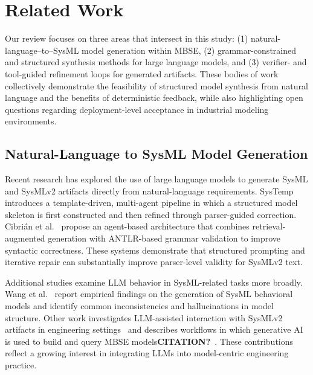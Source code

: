 \documentclass[colorlinks,upint,subscriptcorrection,varvw,hyphenate,balance]{asmeconf} %
\begin{document}

\section{Related Work}

Our review focuses on three areas that intersect in this study: (1) natural-language--to--SysML model generation within MBSE, (2) grammar-constrained and structured synthesis methods for large language models, and (3) verifier- and tool-guided refinement loops for generated artifacts. These bodies of work collectively demonstrate the feasibility of structured model synthesis from natural language and the benefits of deterministic feedback, while also highlighting open questions regarding deployment-level acceptance in industrial modeling environments.

\subsection{Natural-Language to SysML Model Generation}

Recent research has explored the use of large language models to generate SysML and SysMLv2 artifacts directly from natural-language requirements. SysTemp~\cite{bouamra2025systemp} introduces a template-driven, multi-agent pipeline in which a structured model skeleton is first constructed and then refined through parser-guided correction. Cibri{\'a}n et al.~\cite{cibrian2025sysmlagent} propose an agent-based architecture that combines retrieval-augmented generation with ANTLR-based grammar validation to improve syntactic correctness. These systems demonstrate that structured prompting and iterative repair can substantially improve parser-level validity for SysMLv2 text.

Additional studies examine LLM behavior in SysML-related tasks more broadly. Wang et al.~\cite{wang2025sysmlbehaviorllmempirical} report empirical findings on the generation of SysML behavioral models and identify common inconsistencies and hallucinations in model structure. Other work investigates LLM-assisted interaction with SysMLv2 artifacts in engineering settings~\cite{dehart2024sysml_llm} and describes workflows in which generative AI is used to build and query MBSE models\textbf{CITATION?}~\cite{symam24138generativeaimbsemodels}. These contributions reflect a growing interest in integrating LLMs into model-centric engineering practice.
\end{document}
